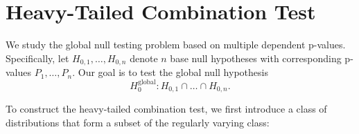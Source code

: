 \documentclass[12pt]{article}
\theoremstyle{plain}
\theoremstyle{plain}
\theoremstyle{definition}
\begin{document}
\section{Heavy-Tailed Combination Test}

We study the global null testing problem based on multiple dependent p-values. Specifically, let $H_{0,1}, \dots, H_{0,n}$ denote $n$ base null hypotheses with corresponding p-values $P_1, \dots, P_n$. Our goal is to test the global null hypothesis
\begin{equation*}
H_0^\mathrm{global}: H_{0,1}\cap \dots \cap H_{0,n}.
\end{equation*}


To construct the heavy-tailed combination test, we first introduce a class of distributions that form a subset of the regularly varying class:
\end{document}
